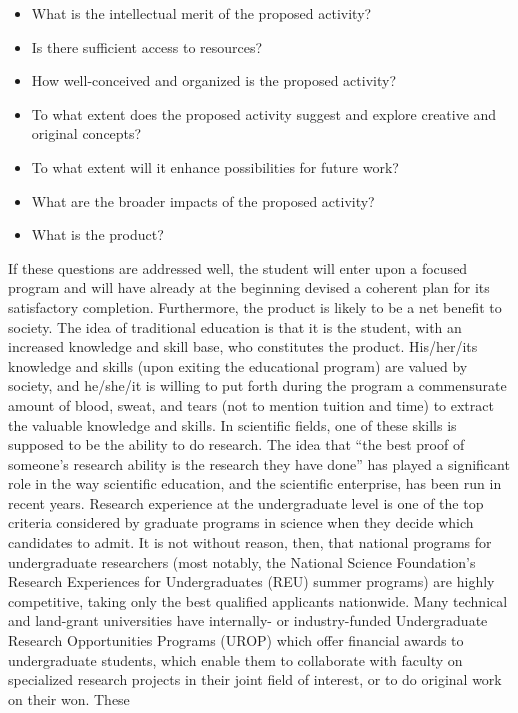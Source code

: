 \begin{itemize}
\item What is the intellectual merit of the proposed activity?
\item Is there sufficient access to resources?
\item How well-conceived and organized is the proposed activity?
\item To what extent does the proposed activity suggest and
  explore creative and original concepts?
\item To what extent will it enhance possibilities for future work?
\item What are the broader impacts of the proposed activity?
\item What is the product?
\end{itemize}

If these questions are addressed well, the student will enter upon a
focused program and will have already at the beginning devised a
coherent plan for its satisfactory completion.  Furthermore, the
product is likely to be a net benefit to society.  The idea of
traditional education is that it is the student, with an increased
knowledge and skill base, who constitutes the product.  His/her/its
knowledge and skills (upon exiting the educational program) are valued
by society, and he/she/it is willing to put forth during the program a
commensurate amount of blood, sweat, and tears (not to mention tuition
and time) to extract the valuable knowledge and skills.  In scientific
fields, one of these skills is supposed to be the ability to do
research.  The idea that ``the best proof of someone's research ability
is the research they have done'' has played a significant role in the
way scientific education, and the scientific enterprise, has been run
in recent years.  Research experience at the undergraduate level is
one of the top criteria considered by graduate programs in science
when they decide which candidates to admit.  It is not without reason,
then, that national programs for undergraduate researchers (most
notably, the National Science Foundation's Research Experiences for
Undergraduates (REU) summer programs) are highly competitive, taking
only the best qualified applicants nationwide.  Many technical and
land-grant universities have internally- or industry-funded
Undergraduate Research Opportunities Programs (UROP) which offer
financial awards to undergraduate students, which enable them to
collaborate with faculty on specialized research projects in their
joint field of interest, or to do original work on their won.  These
